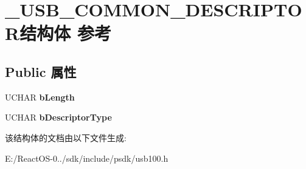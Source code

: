 \hypertarget{struct___u_s_b___c_o_m_m_o_n___d_e_s_c_r_i_p_t_o_r}{}\section{\+\_\+\+U\+S\+B\+\_\+\+C\+O\+M\+M\+O\+N\+\_\+\+D\+E\+S\+C\+R\+I\+P\+T\+O\+R结构体 参考}
\label{struct___u_s_b___c_o_m_m_o_n___d_e_s_c_r_i_p_t_o_r}
\subsection*{Public 属性}
\begin{DoxyCompactItemize}
\item 
\mbox{\label{struct___u_s_b___c_o_m_m_o_n___d_e_s_c_r_i_p_t_o_r_a2e04fdfff78989b7b091e2c3a62c7e28}} 
U\+C\+H\+AR {\bfseries b\+Length}
\item 
\mbox{\label{struct___u_s_b___c_o_m_m_o_n___d_e_s_c_r_i_p_t_o_r_a993f0cc499ec60c554d2d33cd2ee2aad}} 
U\+C\+H\+AR {\bfseries b\+Descriptor\+Type}
\end{DoxyCompactItemize}


该结构体的文档由以下文件生成\+:\begin{DoxyCompactItemize}
\item 
E\+:/\+React\+O\+S-\/0../sdk/include/psdk/usb100.\+h\end{DoxyCompactItemize}
